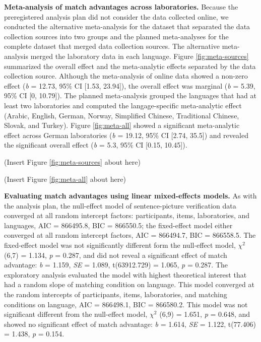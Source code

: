 \documentclass[
  man,floatsintext]{apa6}
\begin{document}
\textbf{Meta-analysis of match advantages across laboratories.} Because the preregistered analysis plan did not consider the data collected online, we conducted the alternative meta-analysis for the dataset that separated the data collection sources into two groups and the planned meta-analyses for the complete dataset that merged data collection sources. The alternative meta-analysis merged the laboratory data in each language. Figure \ref{fig:meta-sources} summarized the overall effect and the meta-analytic effects separated by the data collection source. Although the meta-analysis of online data showed a non-zero effect (\emph{b} = 12.73, 95\% CI {[}1.53, 23.94{]}), the overall effect was marginal (\emph{b} = 5.39, 95\% CI {[}0, 10.79{]}). The planned meta-analysis grouped the languages that had at least two laboratories and computed the langage-specific meta-analytic effect (Arabic, English, German, Norway, Simplified Chinese, Traditional Chinese, Slovak, and Turkey). Figure \ref{fig:meta-all} showed a significant meta-analytic effect across German laboratories (\emph{b} = 19.12, 95\% CI {[}2.74, 35.5{]}) and revealed the significant overall effect (\emph{b} = 5.3, 95\% CI {[}0.15, 10.45{]}).

(Insert Figure \ref{fig:meta-sources} about here)

(Insert Figure \ref{fig:meta-all} about here)

\textbf{Evaluating match advantages using linear mixed-effects models.} As with the analysis plan, the null-effect model of sentence-picture verification data converged at all random intercept factors: participants, items, laboratories, and languages, AIC = 866495.8, BIC = 866550.5; the fixed-effect model either converged at all random intercept factors, AIC = 866494.7, BIC = 866558.5. The fixed-effect model was not significantly different form the null-effect model, \({\chi}^2\) (6,7) = 1.134, \emph{p} = 0.287, and did not reveal a significant effect of match advantage: \emph{b} = 1.159, \emph{SE} = 1.089, t(63912.729) = 1.065, \emph{p} = 0.287. The exploratory analysis evaluated the model with highest theoretical interest that had a random slope of matching condition on language. This model converged at the random intercepts of participants, items, laboratories, and matching conditions on language, AIC = 866498.1, BIC = 866580.2. This model was not significant different from the null-effect model, \({\chi}^2\) (6,9) = 1.651, \emph{p} = 0.648, and showed no significant effect of match advantage: \emph{b} = 1.614, \emph{SE} = 1.122, t(77.406) = 1.438, \emph{p} = 0.154.
\end{document}
